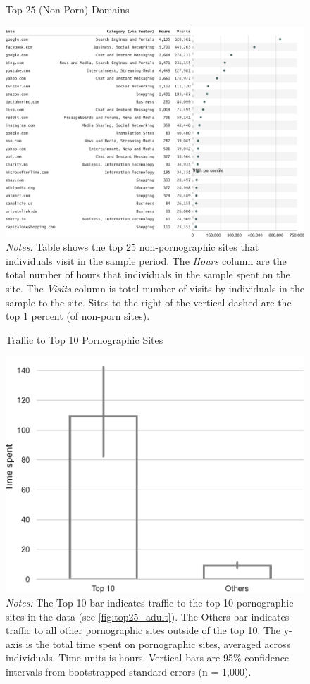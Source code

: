 \documentclass[12pt, letterpaper]{article}
\begin{document}
\begin{figure}
	\centering
	\caption{Top 25 (Non-Porn) Domains}
	\includegraphics[width=\textwidth]{../figs/top_25_nonadultsites.pdf}
	\caption*{\footnotesize \emph{Notes:} 
		Table shows the top 25 non-pornographic sites that individuals visit in the sample period.
		The \emph{Hours} column are the total number of hours that individuals in the sample spent on the site. 
		The \emph{Visits} column is total number of visits by individuals in the sample to the site.  			
		Sites to the right of the vertical dashed are the top 1 percent (of non-porn sites).
	}
	\label{fig:top25_nonadult}
\end{figure}


\begin{figure}
	\centering
	\caption{Traffic to Top 10 Pornographic Sites}
	\includegraphics[width=.5\textwidth]{../figs/concentration_porn_consumption.pdf}
	\caption*{\footnotesize \emph{Notes:} 
		The Top 10 bar indicates traffic to the top 10 pornographic sites in the data (see \cref{fig:top25_adult}).
		The Others bar indicates traffic to all other pornographic sites outside of the top 10.
		The y-axis is the total time spent on pornographic sites, averaged across individuals.
		Time units is hours.
		Vertical bars are 95\% confidence intervals from bootstrapped standard errors (n = 1,000).
	}
	\label{fig:concentration_porn_consumption}
\end{figure}
\end{document}
